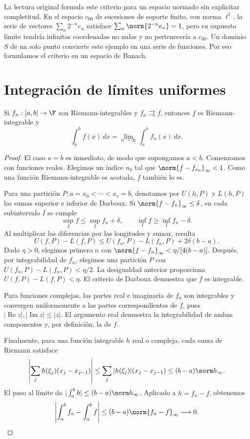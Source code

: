 \begin{observacion}
La lectura original formula este criterio para un espacio normado sin explicitar completitud. En el espacio $c_{00}$ de sucesiones de soporte finito, con norma $\ell^1$, la serie de vectores $\sum_n 2^{-n}e_n$ satisface $\sum_n\norm{2^{-n}e_n}=1$, pero su supuesto límite tendría infinitas coordenadas no nulas y no pertenecería a $c_{00}$. Un dominio $S$ de un solo punto convierte este ejemplo en una serie de funciones. Por eso formulamos el criterio en un espacio de Banach.
\end{observacion}

\section{Integración de límites uniformes}
\begin{teorema}\label{ch26:integracion}
Si $f_n:[a,b]\to\F$ son Riemann-integrables y $f_n\rightrightarrows f$, entonces $f$ es Riemann-integrable y
\[
 \int_a^bf(x)\,dx=\lim_{n\to\infty}\int_a^bf_n(x)\,dx.
\]
\end{teorema}
\begin{proof}
El caso $a=b$ es inmediato, de modo que supongamos $a<b$. Comenzamos con funciones reales. Elegimos un índice $n_0$ tal que $\norm{f-f_{n_0}}_\infty<1$. Como una función Riemann-integrable es acotada, $f$ también lo es.

Para una partición $P:a=x_0<\cdots<x_r=b$, denotamos por $U(h,P)$ y $L(h,P)$ las sumas superior e inferior de Darboux. Si $\norm{f-f_n}_\infty\le\delta$, en cada subintervalo $I$ se cumple
\[
 \sup_I f\le\sup_I f_n+\delta,
 \qquad \inf_I f\ge\inf_I f_n-\delta.
\]
Al multiplicar las diferencias por las longitudes y sumar, resulta
\[
 U(f,P)-L(f,P)\le U(f_n,P)-L(f_n,P)+2\delta(b-a).
\]
Dado $\eta>0$, elegimos primero $n$ con $\norm{f-f_n}_\infty<\eta/[4(b-a)]$. Después, por integrabilidad de $f_n$, elegimos una partición $P$ con $U(f_n,P)-L(f_n,P)<\eta/2$. La desigualdad anterior proporciona $U(f,P)-L(f,P)<\eta$. El criterio de Darboux demuestra que $f$ es integrable.

Para funciones complejas, las partes real e imaginaria de $f_n$ son integrables y convergen uniformemente a las partes correspondientes de $f$, pues $|\operatorname{Re}z|,|\operatorname{Im}z|\le|z|$. El argumento real demuestra la integrabilidad de ambas componentes y, por definición, la de $f$.

Finalmente, para una función integrable $h$ real o compleja, cada suma de Riemann satisface
\[
 \left|\sum_j h(\xi_j)(x_j-x_{j-1})\right|
 \le\sum_j|h(\xi_j)|(x_j-x_{j-1})
 \le(b-a)\norm h_\infty.
\]
El paso al límite da $|\int_a^b h|\le(b-a)\norm h_\infty$. Aplicado a $h=f_n-f$, obtenemos
\[
 \left|\int_a^bf_n-\int_a^bf\right|
 \le(b-a)\norm{f_n-f}_\infty\longrightarrow0.
\]
\end{proof}

